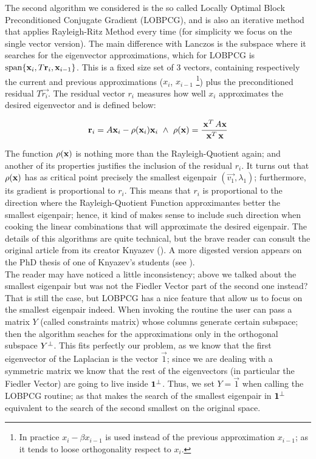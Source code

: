 The second algorithm we considered is the so called Locally Optimal
Block Preconditioned Conjugate Gradient (LOBPCG), and is also an
iterative method that applies Rayleigh-Ritz Method every time (for
simplicity we focus on the single vector version). The main difference
with Lanczos is the subspace where it searches for the eigenvector
approximations, which for LOBPCG is $\operatorname{span} \{\mathbf{x}_i,
T\mathbf{r}_i, \mathbf{x}_{i-1}\}$. This is a fixed size set of 3 vectors,
containing respectively the current and previous approximations
($x_i$, $x_{i-1}$ \footnote{In practice $x_{i} - \beta x_{i-1}$ is used
  instead of the previous approximation $x_{i-1}$; as it tends to
  loose orthogonality respect to $x_i$.}) plus the preconditioned
residual $T\vec{r_i}$. The residual vector $r_i$ measures how well
$x_i$ approximates the desired eigenvector and is defined below:

\begin{equation*}
    \joinabove{0}
    \vec{r}_i = A\vec{x}_i - \func{\rho}(\vec{x}_i)\vec{x}_i
    \ds{\land}
    \func{\rho}(\vec{x}) = \dfrac{\trans{\vec{x}}A\vec{x}}{\trans{\vec{x}}\vec{x}}
\end{equation*}
\joinbelow{1cm}

The function $\operatorname{\rho}(\mathbf{x})$ is nothing more than the
Rayleigh-Quotient again; and another of its properties justifies the
inclusion of the residual $r_i$. It turns out that
$\operatorname{\rho}(\mathbf{x})$ has as critical point precisely the smallest
eigenpair $(\vec{v_1},\lambda_1)$; furthermore, its gradient is
proportional to $r_i$. This means that $r_i$ is proportional to the
direction where the Rayleigh-Quotient Function approximantes better
the smallest eigenpair; hence, it kind of makes sense to include such
direction when cooking the linear combinations that will approximate
the desired eigenpair. The details of this algorithms are quite
technical, but the brave reader can consult the original article from
its creator Knyazev (\cite{knyazev01}). A more digested version
appears on the PhD thesis of one of Knyazev's students (see
\cite{lashuk07}).  \\ 

The reader may have noticed a little inconsistency; above we talked about
the smallest eigenpair but was not the Fiedler Vector part of the
second one instead? That is still the case, but LOBPCG has a nice
feature that allow us to focus on the smallest eigenpair indeed. When
invoking the routine the user can pass a matrix $Y$ (called
constraints matrix) whose columns
generate certain subspace; then the algorithm seaches for the
approximations only in the orthogonal subspace ${Y}^{\bot}$. This fits
perfectly our problem, as we know that the first eigenvector of the
Laplacian is the vector $\vec{1}$; since we are dealing with a
symmetric matrix we know that the rest of the eigenvectors (in
particular the Fiedler Vector) are going to live inside
${\mathbf{1}}^{\bot}$. Thus, we set $Y = \vec{1}$ when calling the LOBPCG
routine; as that makes the search of the smallest eigenpair in
${\mathbf{1}}^{\bot}$ equivalent to the search of the second smallest on
the original space. \\

